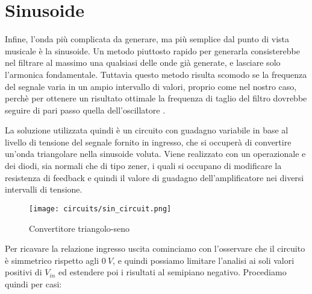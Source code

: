 
\section{Sinusoide}


Infine, l'onda più complicata da generare, ma più semplice dal punto di vista musicale è la
sinusoide. Un metodo piuttosto rapido per generarla consisterebbe nel filtrare al massimo una
qualsiasi delle onde già generate, e lasciare solo l'armonica fondamentale. Tuttavia questo
metodo risulta scomodo se la frequenza del segnale varia in un ampio intervallo di valori,
proprio come nel nostro caso, perchè per ottenere un risultato ottimale la frequenza di taglio
del filtro dovrebbe seguire di pari passo quella dell'oscillatore .

La soluzione utilizzata quindi è un circuito con guadagno variabile in base al livello di
tensione del segnale fornito in ingresso, che si occuperà di convertire un'onda triangolare
nella sinusoide voluta. Viene realizzato con un operazionale e dei diodi, sia normali che di
tipo zener, i quali si occupano di modificare la resistenza di feedback e quindi il valore di
guadagno dell'amplificatore nei diversi intervalli di tensione.

\begin{figure}[H]
    \centering
    \texttt{[image: circuits/sin\_circuit.png]}
    \caption{Convertitore triangolo-seno}
    \label{sin_circuit}
\end{figure}

Per ricavare la relazione ingresso uscita cominciamo con l'osservare che il circuito è
simmetrico rispetto agli $0\ V$, e quindi possiamo limitare l'analisi ai soli valori positivi
di $V_{in}$ ed estendere poi i risultati al semipiano negativo. Procediamo quindi per casi:

